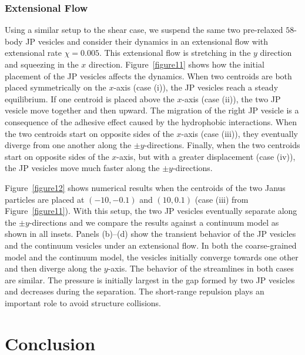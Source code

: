 \documentclass[lineno]{jfm}
\begin{document}
\subsubsection{Extensional Flow}

Using a similar setup to the shear case, we suspend the same two
pre-relaxed $58$-body JP vesicles and consider their dynamics in an
extensional flow with extensional rate $\chi=0.005$. This extensional
flow is stretching in the $y$ direction and squeezing in the $x$
direction. Figure~\ref{figure11} shows how the initial placement of the
JP vesicles affects the dynamics. When two centroids are both placed
symmetrically on the $x$-axis (case (i)), the JP vesicles reach a steady
equilibrium. If one centroid is placed above the $x$-axis (case (ii)),
the two JP vesicle move together and then upward. The migration of the
right JP vesicle is a consequence of the adhesive effect caused by the
hydrophobic interactions. When the two centroids start on opposite sides
of the $x$-axis (case (iii)), they eventually diverge from one another
along the $\pm y$-directions. Finally, when the two centroids start on
opposite sides of the $x$-axis, but with a greater displacement (case
(iv)), the JP vesicles move much faster along the $\pm y$-directions.

Figure~\ref{figure12} shows numerical results when the centroids of the
two Janus particles are placed at $(-10,-0.1)$ and $(10,0.1)$ (case
(iii) from Figure~\ref{figure11}). With this setup, the two JP vesicles
eventually separate along the $\pm y$-directions and we compare the
results against a continuum model as shown in all insets. Panels
(b)--(d) show the transient behavior of the JP vesicles and the
continuum vesicles under an extensional flow. In both the coarse-grained
model and the continuum model, the vesicles initially converge towards
one other and then diverge along the $y$-axis. The behavior of the
streamlines in both cases are similar. The pressure is initially largest
in the gap formed by two JP vesicles and decreases during the
separation. The short-range repulsion plays an important role to avoid
structure collisions.




\section{\label{conclusion}Conclusion}
\end{document}
